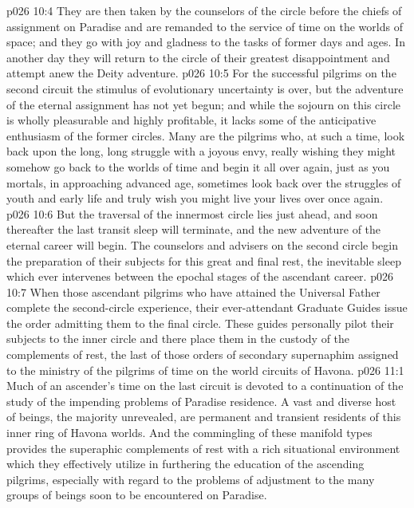 \vs p026 10:4 They are then taken by the counselors of the circle before the chiefs of assignment on Paradise and are remanded to the service of time on the worlds of space; and they go with joy and gladness to the tasks of former days and ages. In another day they will return to the circle of their greatest disappointment and attempt anew the Deity adventure.
\vs p026 10:5 For the successful pilgrims on the second circuit the stimulus of evolutionary uncertainty is over, but the adventure of the eternal assignment has not yet begun; and while the sojourn on this circle is wholly pleasurable and highly profitable, it lacks some of the anticipative enthusiasm of the former circles. Many are the pilgrims who, at such a time, look back upon the long, long struggle with a joyous envy, really wishing they might somehow go back to the worlds of time and begin it all over again, just as you mortals, in approaching advanced age, sometimes look back over the struggles of youth and early life and truly wish you might live your lives over once again.
\vs p026 10:6 But the traversal of the innermost circle lies just ahead, and soon thereafter the last transit sleep will terminate, and the new adventure of the eternal career will begin. The counselors and advisers on the second circle begin the preparation of their subjects for this great and final rest, the inevitable sleep which ever intervenes between the epochal stages of the ascendant career.
\vs p026 10:7 When those ascendant pilgrims who have attained the Universal Father complete the second\hyp{}circle experience, their ever\hyp{}attendant Graduate Guides issue the order admitting them to the final circle. These guides personally pilot their subjects to the inner circle and there place them in the custody of the complements of rest, the last of those orders of secondary supernaphim assigned to the ministry of the pilgrims of time on the world circuits of Havona.
\vs p026 11:1 Much of an ascender’s time on the last circuit is devoted to a continuation of the study of the impending problems of Paradise residence. A vast and diverse host of beings, the majority unrevealed, are permanent and transient residents of this inner ring of Havona worlds. And the commingling of these manifold types provides the superaphic complements of rest with a rich situational environment which they effectively utilize in furthering the education of the ascending pilgrims, especially with regard to the problems of adjustment to the many groups of beings soon to be encountered on Paradise.
